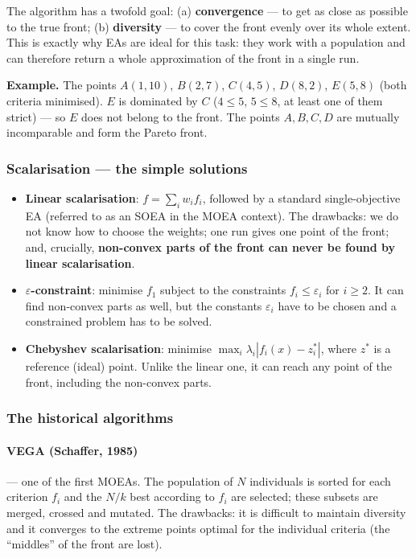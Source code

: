 \documentclass[11pt,a4paper]{article}
\theoremstyle{definition}
\providecommand{\uv}[1]{``#1''}
\begin{document}
The algorithm has a twofold goal: (a) \textbf{convergence} --- to get as close
as possible to the true front; (b) \textbf{diversity} --- to cover the front
evenly over its whole extent. This is exactly why EAs are ideal for this task:
they work with a population and can therefore return a whole approximation of
the front in a single run.

\textbf{Example.} The points $A(1,10)$, $B(2,7)$, $C(4,5)$, $D(8,2)$, $E(5,8)$
(both criteria minimised). $E$ is dominated by $C$ ($4 \le 5$, $5 \le 8$, at
least one of them strict) --- so $E$ does not belong to the front. The points
$A, B, C, D$ are mutually incomparable and form the Pareto front.

\subsubsection{Scalarisation --- the simple solutions}

\begin{itemize}
\item \textbf{Linear scalarisation}: $f = \sum_i w_i f_i$, followed by a
  standard single-objective EA (referred to as an SOEA in the MOEA context). The
  drawbacks: we do not know how to choose the weights; one run gives one point
  of the front; and, crucially, \textbf{non-convex parts of the front can never
  be found by linear scalarisation}.
\item \textbf{$\varepsilon$-constraint}: minimise $f_1$ subject to the
  constraints $f_i \le \varepsilon_i$ for $i \ge 2$. It can find non-convex
  parts as well, but the constants $\varepsilon_i$ have to be chosen and a
  constrained problem has to be solved.
\item \textbf{Chebyshev scalarisation}: minimise
  $\max_i \lambda_i |f_i(x) - z_i^*|$, where $z^*$ is a reference (ideal) point.
  Unlike the linear one, it can reach any point of the front, including the
  non-convex parts.
\end{itemize}

\subsubsection{The historical algorithms}

\paragraph{VEGA (Schaffer, 1985)} --- one of the first MOEAs. The population of
$N$ individuals is sorted for each criterion $f_i$ and the $N/k$ best according
to $f_i$ are selected; these subsets are merged, crossed and mutated.
The drawbacks: it is difficult to maintain diversity and it converges to the
extreme points optimal for the individual criteria (the \uv{middles} of the
front are lost).
\end{document}
